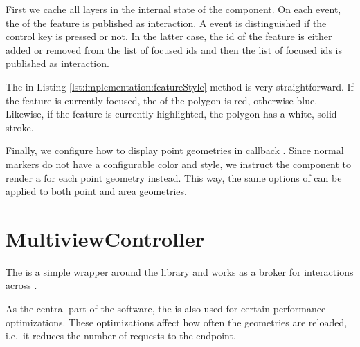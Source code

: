 First we cache all layers in the internal state of the  component.
On each  event, the  of the feature is published as  interaction.
A  event is distinguished if the control key is pressed or not.
In the latter case, the id of the feature is either added or removed from the list of focused ids and then the list of focused ids is published as  interaction.



The  in Listing \ref{lst:implementation:featureStyle} method is very straightforward.
If the feature is currently focused, the  of the polygon is red, otherwise blue.
Likewise, if the feature is currently highlighted, the polygon has a white, solid stroke.



Finally, we configure how to display point geometries in callback .
Since normal markers do not have a configurable color and style, we instruct the  component to render a  for each point geometry instead.
This way, the same options of  can be applied to both point and area geometries.

\section{MultiviewController}

The  is a simple wrapper around the library  and works as a broker for interactions across \cmvs{}.


As the central part of the software, the  is also used for certain performance optimizations.
These optimizations affect how often the geometries are reloaded, i.e.\ it reduces the number of requests to the  endpoint.





